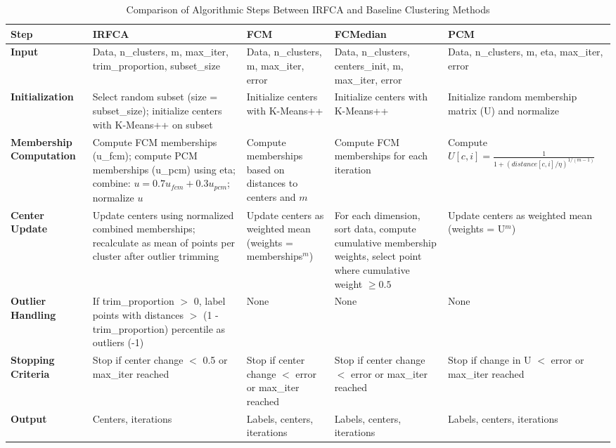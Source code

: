 \documentclass[twoside,11pt]{article}
\begin{document}
\clearpage %
\begin{table}[H]
\centering
\caption{Comparison of Algorithmic Steps Between IRFCA and Baseline Clustering Methods}
\label{tab:algorithm_comparison}
\begin{adjustbox}{max width=\textwidth}
\begin{tabularx}{1.05\textwidth}{p{2.3cm}XXXX}
\toprule
\textbf{Step} & \textbf{IRFCA} & \textbf{FCM} & \textbf{FCMedian} & \textbf{PCM} \\
\midrule

\textbf{Input} &
Data, n\_clusters, m, max\_iter, trim\_proportion, subset\_size &
Data, n\_clusters, m, max\_iter, error &
Data, n\_clusters, centers\_init, m, max\_iter, error &
Data, n\_clusters, m, eta, max\_iter, error \\

\textbf{Initialization} &
Select random subset (size = subset\_size); initialize centers with K-Means++ on subset &
Initialize centers with K-Means++ &
Initialize centers with K-Means++ &
Initialize random membership matrix (U) and normalize \\

\textbf{Membership Computation} &
Compute FCM memberships (u\_fcm); compute PCM memberships (u\_pcm) using eta; combine: $u = 0.7u_{fcm} + 0.3u_{pcm}$; normalize $u$ &
Compute memberships based on distances to centers and $m$ &
Compute FCM memberships for each iteration &
Compute $U[c,i] = \frac{1}{1 + (distance[c,i]/\eta)^{1/(m - 1)}}$ \\

\textbf{Center Update} &
Update centers using normalized combined memberships; recalculate as mean of points per cluster after outlier trimming &
Update centers as weighted mean (weights = memberships$^m$) &
For each dimension, sort data, compute cumulative membership weights, select point where cumulative weight $\ge 0.5$ &
Update centers as weighted mean (weights = U$^m$) \\

\textbf{Outlier Handling} &
If trim\_proportion $>$ 0, label points with distances $>$ (1 - trim\_proportion) percentile as outliers (-1) &
None & None & None \\

\textbf{Stopping Criteria} &
Stop if center change $<$ 0.5 or max\_iter reached &
Stop if center change $<$ error or max\_iter reached &
Stop if center change $<$ error or max\_iter reached &
Stop if change in U $<$ error or max\_iter reached \\

\textbf{Output} &
Centers, iterations &
Labels, centers, iterations &
Labels, centers, iterations &
Labels, centers, iterations \\
\bottomrule
\end{tabularx}
\end{adjustbox}
\end{table}
\clearpage %
\end{document}
